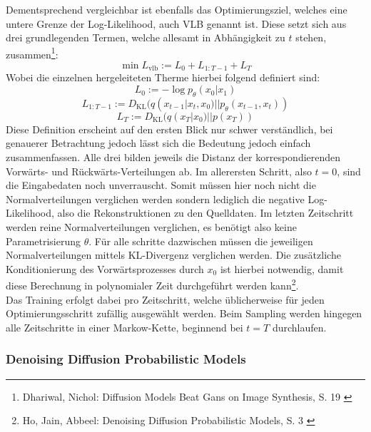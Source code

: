 Dementsprechend vergleichbar ist ebenfalls das Optimierungsziel, welches eine untere Grenze der Log-Likelihood, auch \ac{VLB} genannt ist. Diese setzt sich aus drei grundlegenden Termen, welche allesamt in Abhängigkeit zu $t$ stehen, zusammen\footnote{
    Dhariwal, Nichol: Diffusion Models Beat Gans on Image Synthesis, S. 19
    \cite{dhariwal2021diffusionmodelsbeatgans}
}:
\begin{equation}
    \min L_\text{vlb} := L_0 + L_{1:T-1} + L_T 
\end{equation}
Wobei die einzelnen hergeleiteten Therme hierbei folgend definiert sind:
\begin{equation}
    L_0 := -\log p_\theta(x_0|x_1)
\end{equation}
\begin{equation}
    L_{1:T-1} := D_\text{KL}(q(x_{t-1}|x_t,x_0)||p_\theta(x_{t-1},x_t))
\end{equation}
\begin{equation}
    L_T := D_\text{KL}(q(x_T|x_0)||p(x_T))
\end{equation}
Diese Definition erscheint auf den ersten Blick nur schwer verständlich, bei genauerer Betrachtung jedoch lässt sich die Bedeutung jedoch einfach zusammenfassen. Alle drei bilden jeweils die Distanz der korrespondierenden Vorwärts- und Rückwärts-Verteilungen ab. Im allerersten Schritt, also $t=0$, sind die Eingabedaten noch unverrauscht. Somit müssen hier noch nicht die Normalverteilungen verglichen werden sondern lediglich die negative Log-Likelihood, also die Rekonstruktionen zu den Quelldaten. Im letzten Zeitschritt werden reine Normalverteilungen verglichen, es benötigt also keine Parametrisierung $\theta$. Für alle schritte dazwischen müssen die jeweiligen Normalverteilungen mittels KL-Divergenz verglichen werden. Die zusätzliche Konditionierung des Vorwärtsprozesses durch $x_0$ ist hierbei notwendig, damit diese Berechnung in polynomialer Zeit durchgeführt werden kann\footnote{
    Ho, Jain, Abbeel: Denoising Diffusion Probabilistic Models, S. 3
    \cite{ho2020denoisingdiffusionprobabilisticmodels}
}. \\
Das Training erfolgt dabei pro Zeitschritt, welche üblicherweise für jeden Optimierungsschritt zufällig ausgewählt werden. Beim Sampling werden hingegen alle Zeitschritte in einer Markow-Kette, beginnend bei $t=T$ durchlaufen. 


\subsubsection{Denoising Diffusion Probabilistic Models}

